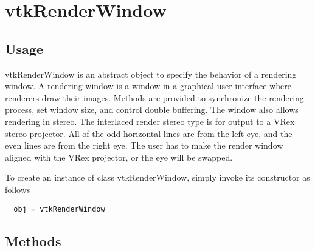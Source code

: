 \section{vtkRenderWindow}

\subsection{Usage}

 vtkRenderWindow is an abstract object to specify the behavior of a
 rendering window. A rendering window is a window in a graphical user
 interface where renderers draw their images. Methods are provided to
 synchronize the rendering process, set window size, and control double
 buffering.  The window also allows rendering in stereo.  The interlaced
 render stereo type is for output to a VRex stereo projector.  All of the
 odd horizontal lines are from the left eye, and the even lines are from
 the right eye.  The user has to make the render window aligned with the
 VRex projector, or the eye will be swapped.

To create an instance of class vtkRenderWindow, simply
invoke its constructor as follows
\begin{verbatim}
  obj = vtkRenderWindow
\end{verbatim}
\subsection{Methods}

